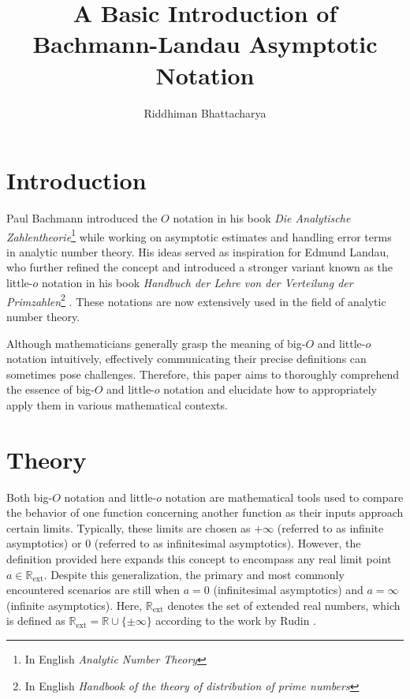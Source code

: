 \documentclass[9pt]{report}
\title{\huge \textbf{A Basic Introduction of Bachmann-Landau Asymptotic Notation }}
\author{\Large Riddhiman Bhattacharya}
\date{}
\theoremstyle{definition}
\begin{document}
\maketitle
\tableofcontents
\hrulefill
\large
\chapter{Introduction}\label{sec:introduction}

Paul Bachmann introduced the $O$ notation in his book \textit{Die Analytische Zahlentheorie}\footnote{In English \textit{Analytic Number Theory}} \cite{Bachmann1894} while working on asymptotic estimates and handling error terms in analytic number theory. His ideas served as inspiration for Edmund Landau, who further refined the concept and introduced a stronger variant known as the little-$o$ notation in his book \textit{Handbuch der Lehre von der Verteilung der Primzahlen}\footnote{In English \textit{Handbook of the theory of distribution of prime numbers}} \cite{Landau1909}. These notations are now extensively used in the field of analytic number theory.

Although mathematicians generally grasp the meaning of big-$O$ and little-$o$ notation intuitively, effectively communicating their precise definitions can sometimes pose challenges. Therefore, this paper aims to thoroughly comprehend the essence of big-$O$ and little-$o$ notation and elucidate how to appropriately apply them in various mathematical contexts.


\chapter{Theory}\label{sec:theory}

Both big-$O$ notation and little-$o$ notation are mathematical tools used to compare the behavior of one function concerning another function as their inputs approach certain limits. Typically, these limits are chosen as \(+\infty\) (referred to as infinite asymptotics) or \(0\) (referred to as infinitesimal asymptotics). However, the definition provided here expands this concept to encompass any real limit point \(a \in \mathbb{R}_\text{ext}\). Despite this generalization, the primary and most commonly encountered scenarios are still when \(a = 0\) (infinitesimal asymptotics) and \(a = \infty\) (infinite asymptotics). Here, \(\mathbb{R}_\text{ext}\) denotes the set of extended real numbers, which is defined as \(\mathbb{R}_\text{ext} = \mathbb{R} \cup \{\pm\infty\}\) according to the work by Rudin \cite{Rudin1953}.
\end{document}
